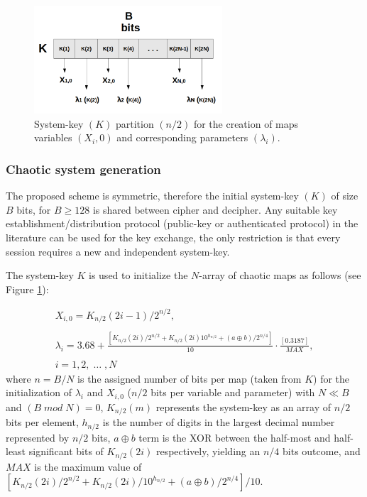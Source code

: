 \documentclass[preprint]{elsarticle}
\begin{document}
\begin{figure}[!ht]
\centering
\includegraphics[width=7cm]{figure3.png}
\caption{System-key $(K)$ partition $(n/2)$ for the creation of maps variables $(X_{i},0)$ and corresponding parameters $(\lambda_{i})$.}
\label{f3}
\end{figure}


\subsubsection{Chaotic system generation}

The proposed scheme is symmetric, therefore the initial system-key $(K)$ of size $B$ bits, for $B \geq 128$ is shared between cipher and decipher. Any suitable key establishment/distribution protocol (public-key or authenticated protocol) in the literature can be used for the key exchange, the only restriction is that every session requires a new and independent system-key.

The system-key $K$ is used to initialize the $N$-array of chaotic maps as follows (see Figure \ref{f3}):

\begin{equation}
\begin{array}{l}
X_{i,0}= K_{n/2}(2i-1)/2^{n/2},
\\ \\
\displaystyle{
\lambda_{i}= 3.68+ \frac{[K_{n/2} (2i)/2^{n/2}+ K_{n/2}(2i)10^{h_{n/2}}+ (a \oplus b)/2^{n/4} ]}{10}\cdot \frac{[0.3187]}{MAX},
}
\\ \\
i = 1, 2, \; \ldots \;, N
\end{array}
\label{ec5}
\end{equation} 
where $n=B/N$ is the assigned number of bits per map (taken from $K$) for the initialization of $\lambda_{i}$ and $X_{i,0}$ ($n/2$ bits per variable and parameter) with $N \ll B$ and $(B \; mod \; N) = 0$, $K_{n/2}(m)$ represents the system-key as an array of $n/2$ bits per element, $h_{n/2}$ is the number of digits in the largest decimal number represented by $n/2$ bits, $a \oplus b$ term is the XOR between the half-most and half-least significant bits of $K_{n/2}(2i)$ respectively, yielding an $n/4$ bits outcome, and $MAX$ is the maximum value of $[K_{n/2}(2i)/2^{n/2} + K_{n/2}(2i)/10^{h_{n/2}} + (a \oplus b)/ 2^{n/4} ]/10$.
\end{document}

